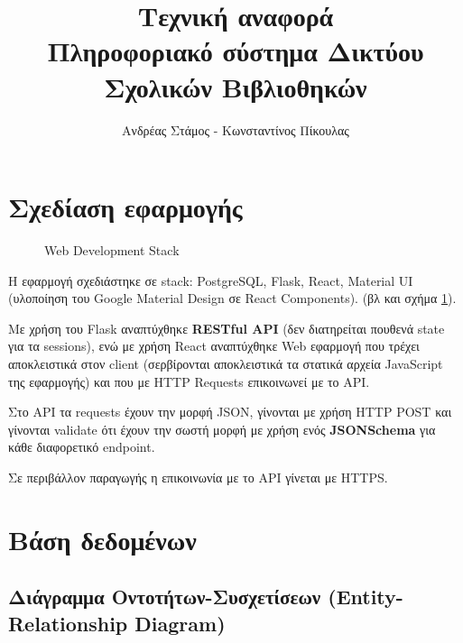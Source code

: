 \documentclass[a4paper]{article}
\title{Τεχνική αναφορά\\\Large Πληροφοριακό σύστημα Δικτύου Σχολικών Βιβλιοθηκών}
\author{Ανδρέας Στάμος - Κωνσταντίνος Πίκουλας}
\date{}
\begin{document}
\maketitle
\thispagestyle{fancy}

\tableofcontents

\section{Σχεδίαση εφαρμογής}

\begin{figure}[H]
\centering

\hspace{1em}
\hspace{1em}
\hspace{1em}
\caption{Web Development Stack}
\label{stack_logos}
\end{figure}

\par Η εφαρμογή σχεδιάστηκε σε stack: PostgreSQL, Flask, React, Material UI (υλοποίηση του Google Material Design σε React Components). (βλ και σχήμα \ref{stack_logos}).

\par Με χρήση του Flask αναπτύχθηκε \textbf{RESTful API} (δεν διατηρείται πουθενά state για τα sessions), ενώ με χρήση React αναπτύχθηκε Web εφαρμογή που τρέχει αποκλειστικά στον client (σερβίρονται αποκλειστικά τα στατικά αρχεία JavaScript της εφαρμογής) και που με HTTP Requests επικοινωνεί με το API.

\par Στο API τα requests έχουν την μορφή JSON, γίνονται με χρήση HTTP POST και γίνονται validate ότι έχουν την σωστή μορφή με χρήση ενός \textbf{JSONSchema} για κάθε διαφορετικό endpoint.

\par Σε περιβάλλον παραγωγής η επικοινωνία με το API γίνεται με HTTPS.

\section{Βάση δεδομένων}

\subsection{Διάγραμμα Οντοτήτων-Συσχετίσεων (Entity-Relationship Diagram)}
\end{document}
